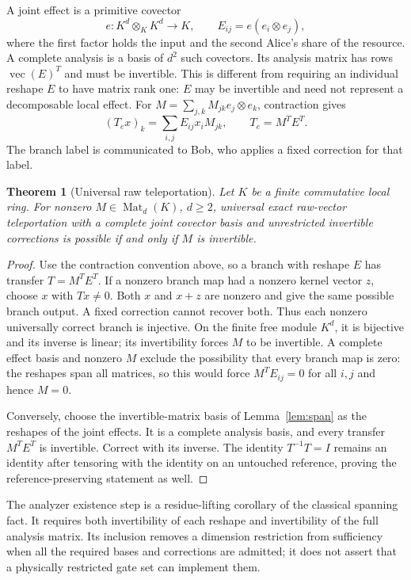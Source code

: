 \documentclass[11pt]{article}
\newtheorem{theorem}{Theorem}[section]
\theoremstyle{definition}\newtheorem{definition}[theorem]{Definition}
\theoremstyle{remark}\newtheorem{remark}[theorem]{Remark}
\DeclareMathOperator{\Mat}{Mat}
\begin{document}
A joint effect is a primitive covector
\[
e:K^d\otimes_K K^d\longrightarrow K,
\qquad E_{ij}=e(e_i\otimes e_j),
\]
where the first factor holds the input and the second Alice's share of the resource. A complete analysis is a basis of $d^2$ such covectors. Its analysis matrix has rows $\operatorname{vec}(E)^T$ and must be invertible. This is different from requiring an individual reshape $E$ to have matrix rank one: $E$ may be invertible and need not represent a decomposable local effect. For $M=\sum_{j,k}M_{jk}e_j\otimes e_k$, contraction gives
\[
(T_ex)_k=\sum_{i,j}E_{ij}x_iM_{jk},\qquad T_e=M^TE^T.
\]
The branch label is communicated to Bob, who applies a fixed correction for that label.

\begin{theorem}[Universal raw teleportation]\label{thm:teleport}
Let $K$ be a finite commutative local ring. For nonzero $M\in\Mat_d(K)$, $d\geq2$, universal exact raw-vector teleportation with a complete joint covector basis and unrestricted invertible corrections is possible if and only if $M$ is invertible.
\end{theorem}
\begin{proof}
Use the contraction convention above, so a branch with reshape $E$ has transfer $T=M^TE^T$. If a nonzero branch map had a nonzero kernel vector $z$, choose $x$ with $Tx\ne0$. Both $x$ and $x+z$ are nonzero and give the same possible branch output. A fixed correction cannot recover both. Thus each nonzero universally correct branch is injective. On the finite free module $K^d$, it is bijective and its inverse is linear; its invertibility forces $M$ to be invertible. A complete effect basis and nonzero $M$ exclude the possibility that every branch map is zero: the reshapes span all matrices, so this would force $M^TE_{ij}=0$ for all $i,j$ and hence $M=0$.

Conversely, choose the invertible-matrix basis of Lemma~\ref{lem:span} as the reshapes of the joint effects. It is a complete analysis basis, and every transfer $M^TE^T$ is invertible. Correct with its inverse. The identity $T^{-1}T=I$ remains an identity after tensoring with the identity on an untouched reference, proving the reference-preserving statement as well.
\end{proof}

The analyzer existence step is a residue-lifting corollary of the classical spanning fact. It requires both invertibility of each reshape and invertibility of the full analysis matrix. Its inclusion removes a dimension restriction from sufficiency when all the required bases and corrections are admitted; it does not assert that a physically restricted gate set can implement them.
\end{document}
